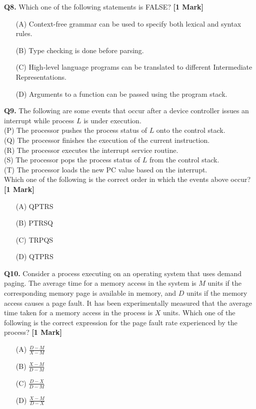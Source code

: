 \documentclass[11pt]{article}
\newcommand{\questiona}[2]{
    \noindent\textbf{Q#2.} #1 \hfill \textbf{[1 Mark]}
}
\begin{document}
\questiona{Which one of the following statements is FALSE?}{8}
\begin{enumerate}
    \item[(A)] Context-free grammar can be used to specify both lexical and syntax rules.
    \item[(B)] Type checking is done before parsing.
    \item[(C)] High-level language programs can be translated to different Intermediate Representations.
    \item[(D)] Arguments to a function can be passed using the program stack.
\end{enumerate}
\vspace{0.5cm}

\questiona{The following are some events that occur after a device controller issues an interrupt while process \( L \) is under execution.\\
(P) The processor pushes the process status of \( L \) onto the control stack.\\
(Q) The processor finishes the execution of the current instruction.\\
(R) The processor executes the interrupt service routine.\\
(S) The processor pops the process status of \( L \) from the control stack.\\
(T) The processor loads the new PC value based on the interrupt.\\
Which one of the following is the correct order in which the events above occur?}{9}
\begin{enumerate}
    \item[(A)] QPTRS
    \item[(B)] PTRSQ
    \item[(C)] TRPQS
    \item[(D)] QTPRS
\end{enumerate}
\vspace{0.5cm}

\questiona{Consider a process executing on an operating system that uses demand paging. The average time for a memory access in the system is \( M \) units if the corresponding memory page is available in memory, and \( D \) units if the memory access causes a page fault. It has been experimentally measured that the average time taken for a memory access in the process is \( X \) units. Which one of the following is the correct expression for the page fault rate experienced by the process?}{10}
\begin{enumerate}
    \item[(A)] \( \frac{D - M}{X - M} \)
    \item[(B)] \( \frac{X - M}{D - M} \)
    \item[(C)] \( \frac{D - X}{D - M} \)
    \item[(D)] \( \frac{X - M}{D - X} \)
\end{enumerate}
\vspace{0.5cm}
\end{document}
